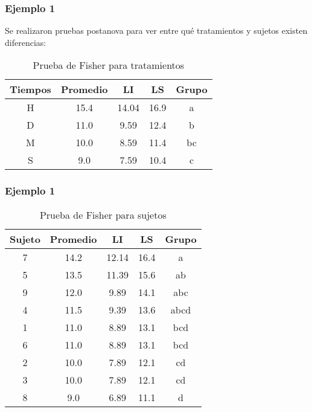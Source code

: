 \documentclass[12pt]{beamer}
\begin{document}
\begin{frame}
\frametitle{Ejemplo 1}
Se realizaron pruebas postanova para ver entre qué tratamientos y sujetos existen diferencias:
\begin{table}[htbp]
  \centering
\resizebox{12cm}{!} {
\begin{tabular}{|c|c|c|c|c|}
\hline 
\textbf{Tiempos} & \textbf{Promedio}  & \textbf{LI} & \textbf{LS} & \textbf{Grupo}\\ 
\hline 
 H    &     15.4  & 14.04 &    16.9  & a \\  
 D    &     11.0  &  9.59 &    12.4  & b \\ 
 M    &     10.0  &  8.59 &    11.4  & bc \\     
 S    &      9.0  &  7.59 &    10.4  & c \\   
\hline 
\end{tabular} 
}
\caption{Prueba de Fisher para tratamientos}
\label{tab:addlabel}%
\end{table}%
\end{frame}

\begin{frame}
\frametitle{Ejemplo 1}
\begin{table}[htbp]
  \centering
\resizebox{10cm}{!} {
\begin{tabular}{|c|c|c|c|c|}
\hline 
\textbf{Sujeto} & \textbf{Promedio} & \textbf{LI} & \textbf{LS} & \textbf{Grupo}\\ 
\hline 
7    &    14.2&   12.14 &    16.4 &  a\\   
5    &    13.5&   11.39 &    15.6 & ab\\   
9    &    12.0&    9.89 &    14.1 & abc\\   
4    &    11.5&    9.39 &    13.6 & abcd\\   
1    &    11.0&     8.89 &    13.1 & bcd\\   
 6    &    11.0&    8.89 &    13.1 & bcd\\   
 2    &    10.0&    7.89  &   12.1 & cd\\   
 3    &    10.0&     7.89 &    12.1 & cd\\   
 8    &     9.0&    6.89  &   11.1 & d\\    
\hline 
\end{tabular} 
}
\caption{Prueba de Fisher para sujetos}
\label{tab:addlabel}%
\end{table}%
\end{frame}
\end{document}
